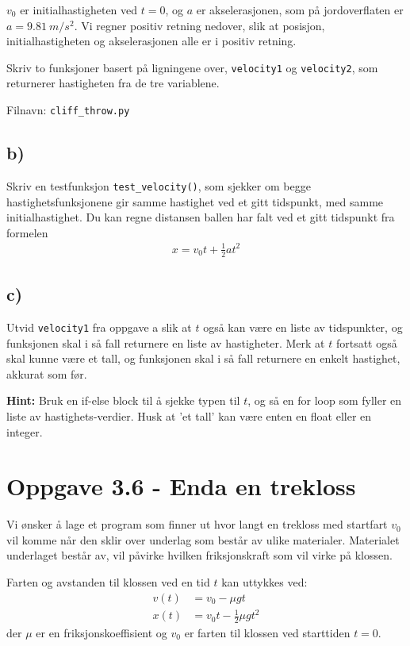 \documentclass[10pt,a4paper]{article}
\newcommand{\half}{\frac{1}{2}}
\begin{document}
$v_0$ er initialhastigheten ved $t=0$, og $a$ er akselerasjonen, som på jordoverflaten er $a = \SI{9.81}{m/s^2}$. Vi regner positiv retning nedover, slik at posisjon, initialhastigheten og akselerasjonen alle er i positiv retning.
 
Skriv to funksjoner basert på ligningene over, \texttt{velocity1} og \texttt{velocity2}, som returnerer hastigheten fra de tre variablene.
 
Filnavn: \texttt{cliff\_throw.py}
 
 
\subsection*{b)}
Skriv en testfunksjon \texttt{test\_velocity()}, som sjekker om begge hastighetsfunksjonene gir samme hastighet ved et gitt tidspunkt, med samme initialhastighet. Du kan regne distansen ballen har falt ved et gitt tidspunkt fra formelen
\begin{align*}
x = v_0t + \half a t^2
\end{align*}
 
 
\subsection*{c)}
Utvid \texttt{velocity1} fra oppgave a slik at $t$ også kan være en liste av tidspunkter, og funksjonen skal i så fall returnere en liste av hastigheter. Merk at $t$ fortsatt også skal kunne være et tall, og funksjonen skal i så fall returnere en enkelt hastighet, akkurat som før.
 
\textbf{Hint:} Bruk en if-else block til å sjekke typen til $t$, og så en for loop som fyller en liste av hastighets-verdier. Husk at 'et tall' kan være enten en float eller en integer.
 
 
 
 
 
\section*{Oppgave 3.6 - Enda en trekloss}
 
Vi ønsker å lage et program som finner ut hvor langt en trekloss med startfart $v_0$ vil komme når den sklir over underlag som består av ulike materialer. Materialet underlaget består av, vil påvirke hvilken friksjonskraft som vil virke på klossen. 
 
Farten og avstanden til klossen ved en tid $t$ kan uttykkes ved:
\begin{align*}
v(t) &= v_0 -  \mu g t \\
x(t) &= v_0t - \frac{1}{2}\mu g t^2
\end{align*}
der $\mu$ er en friksjonskoeffisient og $v_0$ er farten til klossen ved starttiden $t = 0$. 
 
\end{document}
